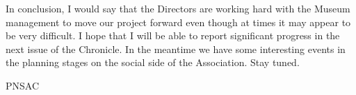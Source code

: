 In conclusion, I would say that the Directors are working hard with
the Museum management to move our project forward even though at times
it may appear to be very difficult.  I hope that I will be able to
report significant progress in the next issue of the Chronicle.  In
the meantime we have some interesting events in the planning stages on
the social side of the Association.  Stay tuned.


\begin{footnotesize}
    \raggedleft PNSAC\\
\end{footnotesize}



